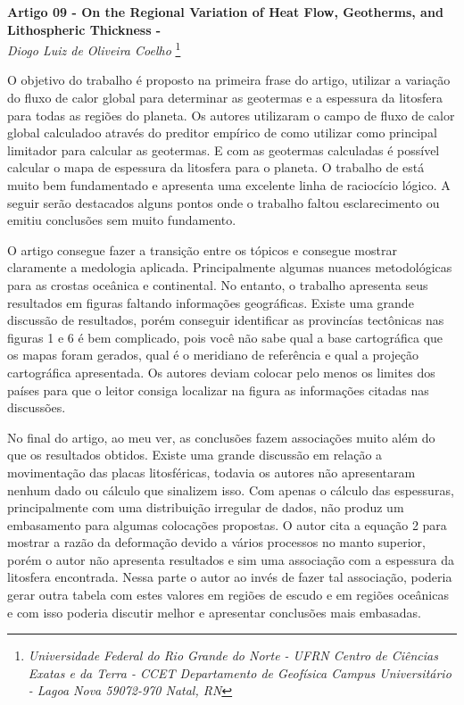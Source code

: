 \documentclass[manuscript]{geophysics}[10pt]
\begin{document}
\begin{center}
\textbf{\LARGE
 Artigo 09 - On the Regional Variation of Heat Flow, Geotherms, and Lithospheric Thickness - \cite{pollack_regional_1977}} \\
\textit{Diogo Luiz de Oliveira Coelho}
\footnote{\textit{Universidade Federal do Rio Grande do Norte - UFRN
Centro de Ciências Exatas e da Terra - CCET
Departamento de Geofísica
Campus Universitário - Lagoa Nova
59072-970 Natal, RN}}
\end{center} 

O objetivo do trabalho é proposto na primeira frase do artigo, utilizar a variação do fluxo de calor global para determinar as geotermas e a espessura da litosfera para todas as regiões do planeta. Os autores utilizaram o campo de fluxo de calor global calculadoo através do preditor empírico de \cite{chapman_global_1975} como 
utilizar como principal limitador para calcular as geotermas. E com as geotermas calculadas é possível calcular o mapa de espessura da litosfera para o planeta. O trabalho de \cite{pollack_regional_1977} está muito bem fundamentado e apresenta uma excelente linha de raciocício lógico. A seguir serão destacados alguns pontos onde o trabalho faltou esclarecimento ou emitiu conclusões sem muito fundamento.

O artigo consegue fazer a transição entre os tópicos e consegue mostrar claramente a medologia aplicada. Principalmente algumas nuances metodológicas para as crostas oceânica e continental. No entanto, o trabalho apresenta seus resultados em figuras faltando informações geográficas. Existe uma grande discussão de resultados, porém conseguir identificar as provincías tectônicas nas figuras 1 e 6 é bem complicado, pois você não sabe qual a base cartográfica que os mapas foram gerados, qual é o meridiano de referência e qual a projeção cartográfica apresentada. Os autores deviam colocar pelo menos os limites dos países para que o leitor consiga localizar na figura as informações citadas nas discussões.

No final do artigo, ao meu ver, as conclusões fazem associações muito além do que os resultados obtidos. Existe uma grande discussão em relação a movimentação das placas litosféricas, todavia os autores não apresentaram nenhum dado ou cálculo que sinalizem isso. Com apenas o cálculo das espessuras, principalmente com uma distribuição irregular de dados, não produz um embasamento para algumas colocações propostas. O autor cita a equação 2 para mostrar a razão da deformação devido a vários processos no manto superior, porém o autor não apresenta resultados e sim uma associação com a espessura da litosfera encontrada. Nessa parte o autor ao invés de fazer tal associação, poderia gerar outra tabela com estes valores em regiões de escudo e em regiões oceânicas e com isso poderia discutir melhor e apresentar conclusões mais embasadas.




    
\end{document}
